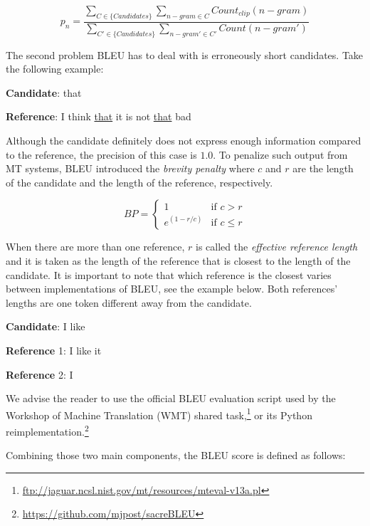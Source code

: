 \begin{equation}
    p_n=\frac{\sum_{C\in\{Candidates\}}\sum_{n-gram\in C}Count_{clip}(n-gram)}{\sum_{C'\in\{Candidates\}}\sum_{n-gram'\in C'}Count(n-gram')}
\end{equation}

The second problem BLEU has to deal with is erroneously short candidates.
Take the following example:

\bigskip

\textbf{Candidate}: that

\textbf{Reference}: I think \underline{that} it is not \underline{that} bad

\bigskip

Although the candidate definitely does not express enough information compared to the reference, the precision of this case is $1.0$.
To penalize such output from MT systems, BLEU introduced the \textit{brevity penalty} where $c$ and $r$ are the length of the candidate and the length of the reference, respectively.

\begin{equation}
    BP=\begin{cases} 1 & \mbox{if } c>r \\ e^{(1-r/c)} & \mbox{if } c\le r \end{cases}
\end{equation}

When there are more than one reference, $r$ is called the \textit{effective reference length} and it is taken as the length of the reference that is closest to the length of the candidate.
It is important to note that which reference is the closest varies between implementations of BLEU, see the example below. Both references' lengths are one token different away from the candidate.

\bigskip

\textbf{Candidate}: I like

\textbf{Reference} 1: I like it

\textbf{Reference} 2: I

\bigskip

We advise the reader to use the official BLEU evaluation script used by the Workshop of Machine Translation (WMT) shared task,\footnote{\url{ftp://jaguar.ncsl.nist.gov/mt/resources/mteval-v13a.pl}} or its Python reimplementation.\footnote{\url{https://github.com/mjpost/sacreBLEU}}

Combining those two main components, the BLEU score is defined as follows:

